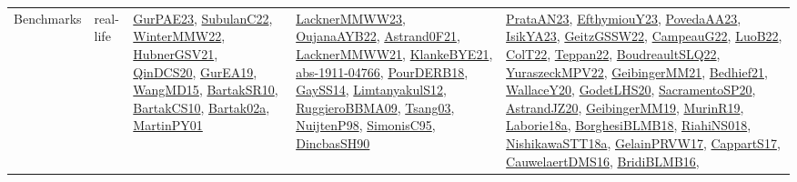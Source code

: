 {\begin{longtable}{lp{3cm}>{\raggedright}p{6cm}>{\raggedright}p{6cm}p{8cm}}
Benchmarks & real-life & \href{articles/GurPAE23.pdf}{GurPAE23}\cite{GurPAE23}, \href{articles/SubulanC22.pdf}{SubulanC22}\cite{SubulanC22}, \href{papers/WinterMMW22.pdf}{WinterMMW22}\cite{WinterMMW22}, \href{articles/HubnerGSV21.pdf}{HubnerGSV21}\cite{HubnerGSV21}, \href{articles/QinDCS20.pdf}{QinDCS20}\cite{QinDCS20}, \href{articles/GurEA19.pdf}{GurEA19}\cite{GurEA19}, \href{articles/WangMD15.pdf}{WangMD15}\cite{WangMD15}, \href{articles/BartakSR10.pdf}{BartakSR10}\cite{BartakSR10}, \href{articles/BartakCS10.pdf}{BartakCS10}\cite{BartakCS10}, \href{papers/Bartak02a.pdf}{Bartak02a}\cite{Bartak02a}, \href{articles/MartinPY01.pdf}{MartinPY01}\cite{MartinPY01} & \href{articles/LacknerMMWW23.pdf}{LacknerMMWW23}\cite{LacknerMMWW23}, \href{papers/OujanaAYB22.pdf}{OujanaAYB22}\cite{OujanaAYB22}, \href{papers/Astrand0F21.pdf}{Astrand0F21}\cite{Astrand0F21}, \href{papers/LacknerMMWW21.pdf}{LacknerMMWW21}\cite{LacknerMMWW21}, \href{papers/KlankeBYE21.pdf}{KlankeBYE21}\cite{KlankeBYE21}, \href{articles/abs-1911-04766.pdf}{abs-1911-04766}\cite{abs-1911-04766}, \href{articles/PourDERB18.pdf}{PourDERB18}\cite{PourDERB18}, \href{papers/GaySS14.pdf}{GaySS14}\cite{GaySS14}, \href{articles/LimtanyakulS12.pdf}{LimtanyakulS12}\cite{LimtanyakulS12}, \href{articles/RuggieroBBMA09.pdf}{RuggieroBBMA09}\cite{RuggieroBBMA09}, \href{articles/Tsang03.pdf}{Tsang03}\cite{Tsang03}, \href{articles/NuijtenP98.pdf}{NuijtenP98}\cite{NuijtenP98}, \href{papers/SimonisC95.pdf}{SimonisC95}\cite{SimonisC95}, \href{articles/DincbasSH90.pdf}{DincbasSH90}\cite{DincbasSH90} & \href{articles/PrataAN23.pdf}{PrataAN23}\cite{PrataAN23}, \href{papers/EfthymiouY23.pdf}{EfthymiouY23}\cite{EfthymiouY23}, \href{papers/PovedaAA23.pdf}{PovedaAA23}\cite{PovedaAA23}, \href{articles/IsikYA23.pdf}{IsikYA23}\cite{IsikYA23}, \href{papers/GeitzGSSW22.pdf}{GeitzGSSW22}\cite{GeitzGSSW22}, \href{articles/CampeauG22.pdf}{CampeauG22}\cite{CampeauG22}, \href{papers/LuoB22.pdf}{LuoB22}\cite{LuoB22}, \href{articles/ColT22.pdf}{ColT22}\cite{ColT22}, \href{papers/Teppan22.pdf}{Teppan22}\cite{Teppan22}, \href{papers/BoudreaultSLQ22.pdf}{BoudreaultSLQ22}\cite{BoudreaultSLQ22}, \href{articles/YuraszeckMPV22.pdf}{YuraszeckMPV22}\cite{YuraszeckMPV22}, \href{papers/GeibingerMM21.pdf}{GeibingerMM21}\cite{GeibingerMM21}, \href{articles/Bedhief21.pdf}{Bedhief21}\cite{Bedhief21}, \href{articles/WallaceY20.pdf}{WallaceY20}\cite{WallaceY20}, \href{papers/GodetLHS20.pdf}{GodetLHS20}\cite{GodetLHS20}, \href{articles/SacramentoSP20.pdf}{SacramentoSP20}\cite{SacramentoSP20}, \href{articles/AstrandJZ20.pdf}{AstrandJZ20}\cite{AstrandJZ20}, \href{papers/GeibingerMM19.pdf}{GeibingerMM19}\cite{GeibingerMM19}, \href{papers/MurinR19.pdf}{MurinR19}\cite{MurinR19}, \href{papers/Laborie18a.pdf}{Laborie18a}\cite{Laborie18a}, \href{articles/BorghesiBLMB18.pdf}{BorghesiBLMB18}\cite{BorghesiBLMB18}, \href{papers/RiahiNS018.pdf}{RiahiNS018}\cite{RiahiNS018}, \href{papers/NishikawaSTT18a.pdf}{NishikawaSTT18a}\cite{NishikawaSTT18a}, \href{papers/GelainPRVW17.pdf}{GelainPRVW17}\cite{GelainPRVW17}, \href{papers/CappartS17.pdf}{CappartS17}\cite{CappartS17}, \href{papers/CauwelaertDMS16.pdf}{CauwelaertDMS16}\cite{CauwelaertDMS16}, \href{articles/BridiBLMB16.pdf}{BridiBLMB16}\cite{BridiBLMB16}, 
\end{longtable}}
